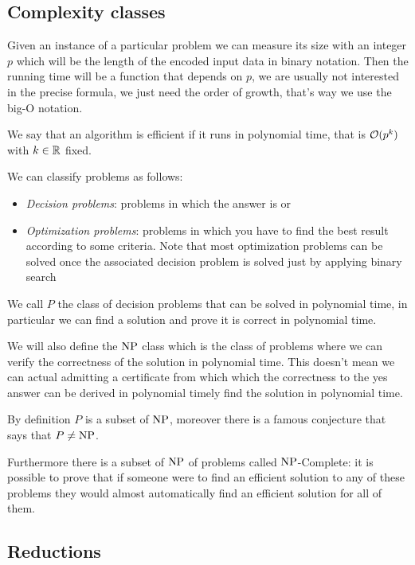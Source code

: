 \documentclass[12pt]{extarticle}
\newcommand{\NP}{{\operatorfont NP}}
\newcommand{\NPC}{$\NP$-Complete}
\begin{document}
\subsection{Complexity classes}

Given an instance of a particular problem we can measure its size with an integer $p$ which will be the length of the encoded input data in binary notation.
Then the running time will be a function that depends on $p$, we are usually not interested in the precise formula, we just need the order of growth, that's way we use the big-O notation.

We say that an algorithm is efficient if it runs in polynomial time, that is $\mathcal{O}(p^k)$ with $k \in \mathbb{R}$ fixed.

We can classify problems as follows:
\begin{itemize}
    \item \emph{Decision problems}: problems in which the answer is  or 
    \item \emph{Optimization problems}: problems in which you have to find the best result according to some criteria.
          Note that most optimization problems can be solved once the associated decision problem is solved just by applying binary search
\end{itemize}

We call $P$ the class of decision problems that can be solved in polynomial time, in particular we can find a solution and prove it is correct in polynomial time.

We will also define the $\NP$ class which is the class of problems where we can verify the correctness of the solution in polynomial time.
This doesn't mean we can actual admitting a certificate from which which the correctness to the yes answer can be derived in polynomial timely find the solution in polynomial time.

By definition $P$ is a subset of $\NP$, moreover there is a famous conjecture that says that $P \neq \NP$.

Furthermore there is a subset of $\NP$ of problems called \NPC: it is possible to prove that if someone were to find an efficient solution to any of these problems they would almost automatically find an efficient solution for all of them.

\subsection{Reductions}
\end{document}
